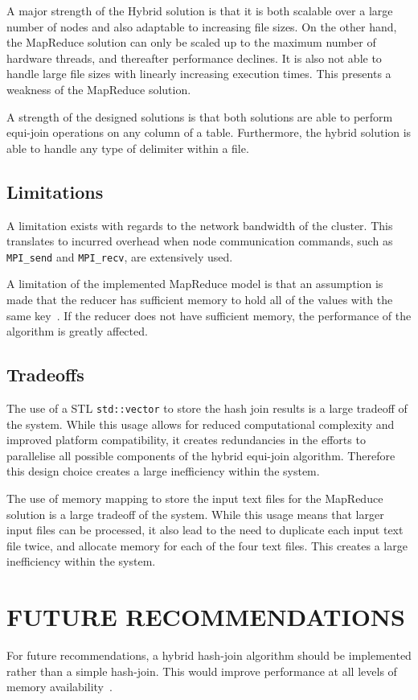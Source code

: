 \documentclass[12pt,twocolumn]{witseiepaper}
\begin{document}
A major strength of the Hybrid solution is that it is both scalable over a large number of nodes and also adaptable to increasing file sizes. On the other hand, the MapReduce solution can only be scaled up to the maximum number of hardware threads, and thereafter performance declines. It is also not able to handle large file sizes with linearly increasing execution times. This presents a weakness of the MapReduce solution.

A strength of the designed solutions is that both solutions are able to perform equi-join operations on any column of a table. Furthermore, the hybrid solution is able to handle any type of delimiter within a file.

\subsection{Limitations}
A limitation exists with regards to the network bandwidth of the cluster. This translates to incurred overhead when node communication commands, such as \texttt{MPI\_send} and \texttt{MPI\_recv}, are extensively used.

A limitation of the implemented MapReduce model is that an assumption is made that the reducer has sufficient memory to hold all of the values with the same key~\cite{mapReduceJoin}. If the reducer does not have sufficient memory, the performance of the algorithm is greatly affected.

\subsection{Tradeoffs} \label{sec:tradeoffs}
The use of a STL \texttt{std::vector} to store the hash join results is a large tradeoff of the system. While this usage allows for reduced computational complexity and improved platform compatibility, it creates redundancies in the efforts to parallelise all possible components of the hybrid equi-join algorithm. Therefore this design choice creates a large inefficiency within the system.

The use of memory mapping to store the input text files for the MapReduce solution is a large tradeoff of the system. While this usage means that larger input files can be processed, it also lead to the need to duplicate each input text file twice, and allocate memory for each of the four text files. This creates a large inefficiency within the system.

\section{FUTURE RECOMMENDATIONS}
For future recommendations, a hybrid hash-join algorithm should be implemented rather than a simple hash-join. This would improve performance at all levels of memory availability~\cite{evaluating4JoinAlgorithms}.
\end{document}
